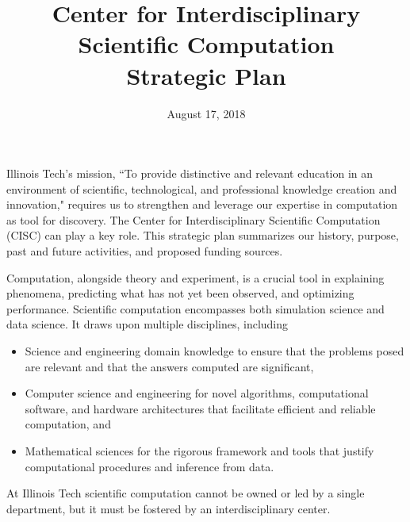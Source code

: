 \documentclass[12pt]{amsart}
\begin{document}
\title[Center for Interdisciplinary Scientific Computation Strategic Plan]{Center for Interdisciplinary Scientific Computation \\ Strategic Plan}
\date{August 17, 2018}
\maketitle


Illinois Tech's mission, ``To provide distinctive and relevant education in an environment of scientific, technological, and professional knowledge creation and innovation," requires us to strengthen and leverage our expertise in computation as tool for discovery.  The Center for Interdisciplinary Scientific Computation (CISC) can play a key role. This strategic plan  summarizes our history, purpose, past and future activities, and proposed funding sources.

Computation, alongside theory and experiment, is a crucial tool in explaining phenomena, predicting what has not yet been observed, and optimizing performance.  Scientific computation encompasses both simulation science and data science. It draws upon multiple disciplines, including
\begin{itemize}
    \item Science and engineering domain knowledge to ensure that the problems posed are relevant and that the answers computed are significant,
    \item Computer science and engineering for novel algorithms, computational software, and hardware architectures that facilitate efficient and reliable computation, and
    \item Mathematical sciences for the rigorous framework and tools that justify computational procedures and inference from data.
\end{itemize}
At Illinois Tech scientific computation cannot be owned or led by a single department, but it must be fostered by an interdisciplinary center.
\end{document}
